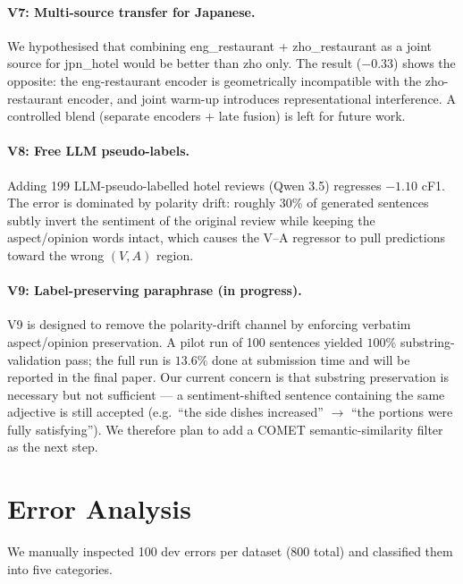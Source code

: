 \documentclass[11pt]{article}
\begin{document}
\paragraph{V7: Multi-source transfer for Japanese.}
We hypothesised that combining eng\_restaurant + zho\_restaurant as a
joint source for jpn\_hotel would be better than zho only. The result
($-0.33$) shows the opposite: the eng-restaurant encoder is geometrically
incompatible with the zho-restaurant encoder, and joint warm-up
introduces representational interference. A controlled blend
(separate encoders + late fusion) is left for future work.

\paragraph{V8: Free LLM pseudo-labels.}
Adding 199 LLM-pseudo-labelled hotel reviews (Qwen 3.5) regresses
$-1.10$ cF1. The error is dominated by polarity drift: roughly 30\%
of generated sentences subtly invert the sentiment of the original
review while keeping the aspect/opinion words intact, which causes
the V--A regressor to pull predictions toward the wrong $(V,A)$
region.

\paragraph{V9: Label-preserving paraphrase (in progress).}
V9 is designed to remove the polarity-drift channel by enforcing
verbatim aspect/opinion preservation. A pilot run of 100 sentences
yielded $100\%$ substring-validation pass; the full run is $13.6\%$
done at submission time and will be reported in the final paper. Our
current concern is that substring preservation is necessary but not
sufficient — a sentiment-shifted sentence containing the same
adjective is still accepted (e.g.\ ``the side dishes increased'' $\to$
``the portions were fully satisfying''). We therefore plan to add a
COMET semantic-similarity filter
\cite{rei2022comet} as the next step.

\section{Error Analysis}
\label{sec:error}

We manually inspected 100 dev errors per dataset (800 total) and
classified them into five categories.
\end{document}
